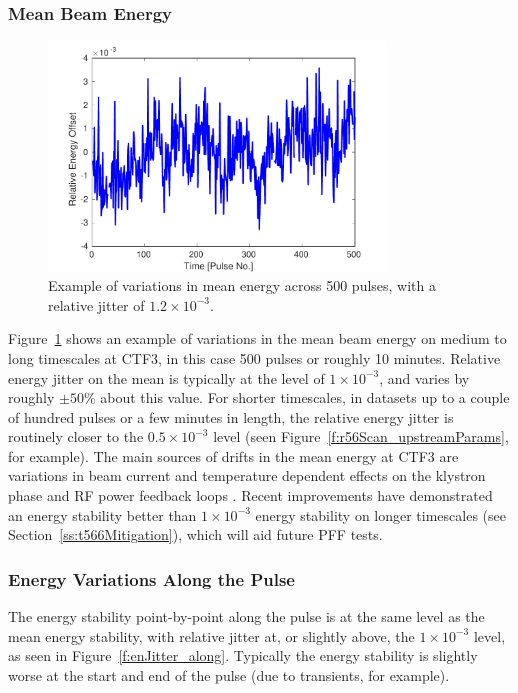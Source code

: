 \subsubsection{Mean Beam Energy}

\begin{figure}
  \centering
  \includegraphics[width=0.8\textwidth]{Figures/propagation/enJitter_mean}
  \caption{Example of variations in mean energy across 500 pulses, with a relative jitter of \(1.2\times 10^{-3}\).}
  \label{f:enJitter_mean}
\end{figure}

Figure~\ref{f:enJitter_mean} shows an example of variations in the mean beam energy on medium to long timescales at CTF3, in this case 500 pulses or roughly 10 minutes. Relative energy jitter on the mean is typically at the level of \(1 \times 10^{-3}\), and varies by roughly \(\pm50\%\) about this value. For shorter timescales, in datasets up to a couple of hundred pulses or a few minutes in length, the relative energy jitter is routinely closer to the \(0.5 \times 10^{-3}\) level (seen Figure~\ref{f:r56Scan_upstreamParams}, for example). The main sources of drifts in the mean energy at CTF3 are variations in beam current and temperature dependent effects on the klystron phase and RF power feedback loops \cite{lukasIPAC16}. Recent improvements have demonstrated an energy stability better than \(1 \times 10^{-3}\) energy stability on longer timescales (see Section~\ref{ss:t566Mitigation}), which will aid future PFF tests.

\subsubsection{Energy Variations Along the Pulse}

The energy stability point-by-point along the pulse is at the same level as the mean energy stability, with relative jitter at, or slightly above, the \(1 \times 10^{-3}\) level, as seen in Figure~\ref{f:enJitter_along}. Typically the energy stability is slightly worse at the start and end of the pulse (due to transients, for example).

